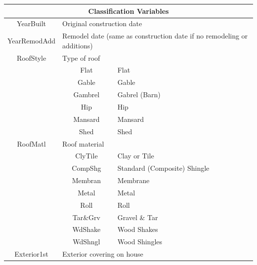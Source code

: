 \documentclass[11pt]{scrartcl} %
\begin{document}
\begin{center}
\begin{tabular}{c c c c c c}
\hline
\multicolumn{6}{|c|}{Classification Variables}\\
\hline
\multicolumn{2}{|c}{YearBuilt} & \multicolumn{4}{l|}{Original construction date}\\
\hline
\multicolumn{2}{|c}{YearRemodAdd} & \multicolumn{4}{l|}{Remodel date (same as construction date if no remodeling or additions)}\\
\hline
\multicolumn{2}{|c}{RoofStyle} & \multicolumn{4}{l|}{Type of roof}\\ 
\multicolumn{2}{|c}{} & \multicolumn{1}{c}{Flat} & \multicolumn{3}{l|}{Flat}\\
\multicolumn{2}{|c}{} & \multicolumn{1}{c}{Gable} & \multicolumn{3}{l|}{Gable}\\
\multicolumn{2}{|c}{} & \multicolumn{1}{c}{Gambrel} & \multicolumn{3}{l|}{Gabrel (Barn)}\\
\multicolumn{2}{|c}{} & \multicolumn{1}{c}{Hip} & \multicolumn{3}{l|}{Hip}\\
\multicolumn{2}{|c}{} & \multicolumn{1}{c}{Mansard} & \multicolumn{3}{l|}{Mansard}\\
\multicolumn{2}{|c}{} & \multicolumn{1}{c}{Shed} & \multicolumn{3}{l|}{Shed}\\
\hline
\multicolumn{2}{|c}{RoofMatl} & \multicolumn{4}{l|}{Roof material}\\ 
\multicolumn{2}{|c}{} & \multicolumn{1}{c}{ClyTile} & \multicolumn{3}{l|}{Clay or Tile}\\
\multicolumn{2}{|c}{} & \multicolumn{1}{c}{CompShg} & \multicolumn{3}{l|}{Standard (Composite) Shingle}\\
\multicolumn{2}{|c}{} & \multicolumn{1}{c}{Membran} & \multicolumn{3}{l|}{Membrane}\\
\multicolumn{2}{|c}{} & \multicolumn{1}{c}{Metal} & \multicolumn{3}{l|}{Metal}\\
\multicolumn{2}{|c}{} & \multicolumn{1}{c}{Roll} & \multicolumn{3}{l|}{Roll}\\
\multicolumn{2}{|c}{} & \multicolumn{1}{c}{Tar\&Grv} & \multicolumn{3}{l|}{Gravel \& Tar}\\
\multicolumn{2}{|c}{} & \multicolumn{1}{c}{WdShake} & \multicolumn{3}{l|}{Wood Shakes}\\
\multicolumn{2}{|c}{} & \multicolumn{1}{c}{WdShngl} & \multicolumn{3}{l|}{Wood Shingles}\\
\hline
\multicolumn{2}{|c}{Exterior1st} & \multicolumn{4}{l|}{Exterior covering on house}\\ 

\end{tabular}
\end{center}
\end{document}
